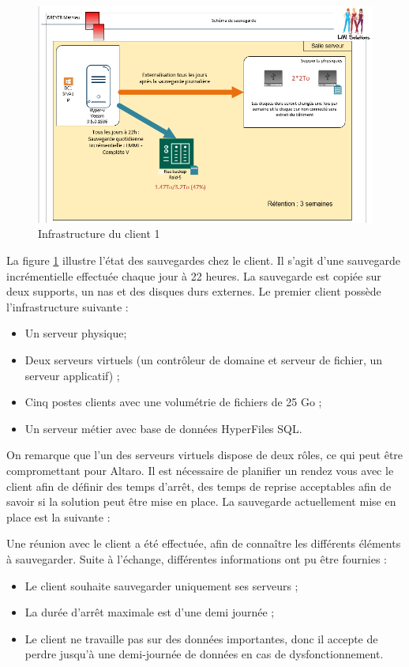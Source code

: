 \documentclass[pfe]{tnreport} %
\begin{document}
\begin{figure}[ht]
 \centering
 \includegraphics[width=15cm]{figures/client1.png}
 \caption{Infrastructure du client 1}
 \label{fig:client1}
\end{figure}
La figure \ref{fig:client1} illustre l'état des sauvegardes chez le client. \newline
Il s'agit d'une sauvegarde incrémentielle effectuée chaque jour à 22 heures. La sauvegarde est copiée sur deux supports, un nas et des disques durs externes. \newline
Le premier client possède l'infrastructure suivante : \newline
\begin{itemize}
 \item Un serveur physique;
 \item Deux serveurs virtuels (un contrôleur de domaine et serveur de fichier, un serveur applicatif) ;
\item Cinq postes clients avec une volumétrie de fichiers de 25 Go ;
\item Un serveur métier avec base de données HyperFiles SQL. \newline
\end{itemize}
On remarque que l'un des serveurs virtuels dispose de deux rôles, ce qui peut être compromettant pour Altaro. Il est nécessaire de planifier un rendez vous avec le client afin de définir des temps d'arrêt, des temps de reprise acceptables afin de savoir si la solution peut être mise en place. \newline
La sauvegarde actuellement mise en place est la suivante : 


Une réunion avec le client a été effectuée, afin de connaître les différents éléments à sauvegarder. Suite à l'échange, différentes informations ont pu être fournies : \newline
\begin{itemize}
 \item Le client souhaite sauvegarder uniquement ses serveurs ;
 \item La durée d'arrêt maximale est d'une demi journée ;
 \item Le client ne travaille pas sur des données importantes, donc il accepte de perdre jusqu'à une demi-journée de données en cas de dysfonctionnement. \newline
\end{itemize}
\end{document}

